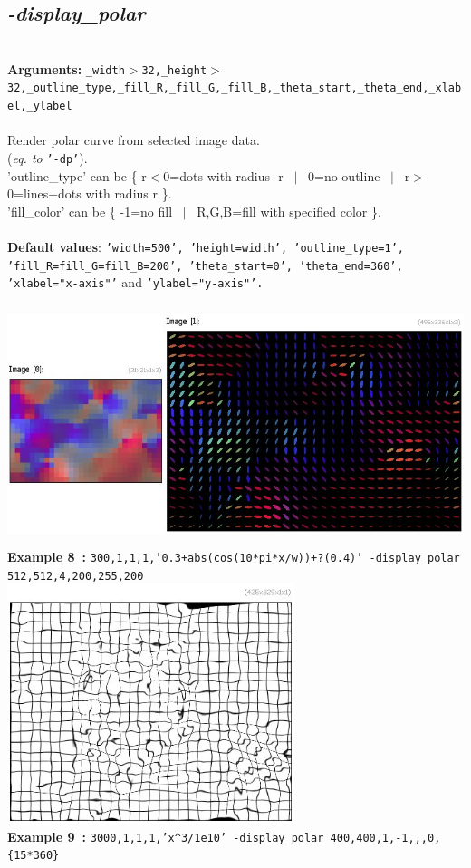\documentclass[a4paper,11pt,twoside]{book}
\begin{document}
\subsection{\emph{-display\_polar} }\vspace*{-0.5em}
~\\\textbf{Arguments: } 
{\small \texttt{\_width$>$32,\_height$>$32,\_outline\_type,\_fill\_R,\_fill\_G,\_fill\_B,\_theta\_start,\_theta\_end,\_xlabel,\_ylabel}}\\~\\
Render polar curve from selected image data.
~\\(\emph{eq. to} {\small \texttt{'-dp'}}).
~\\'outline\_type' can be \{ r$<$0=dots with radius -r ~$|$~ 0=no outline ~$|$~ r$>$0=lines+dots with radius r \}.
~\\'fill\_color' can be \{ -1=no fill ~$|$~ R,G,B=fill with specified color \}.
~\\~\\\textbf{Default values}: {\small \texttt{'width=500', 'height=width', 'outline\_type=1', 'fill\_R=fill\_G=fill\_B=200', 'theta\_start=0', 'theta\_end=360', 'xlabel="x-axis"'} and \texttt{'ylabel="y-axis"'.}}
\begin{center}\includegraphics[keepaspectratio=true,height=7cm,width=\textwidth]{img/gmic_def8.jpg}\\
{\footnotesize \textbf{Example 8~:} \texttt{300,1,1,1,'0.3+abs(cos(10*pi*x/w))+?(0.4)' -display\_polar 512,512,4,200,255,200}}
\\\includegraphics[keepaspectratio=true,height=7cm,width=\textwidth]{img/gmic_def9.jpg}\\
{\footnotesize \textbf{Example 9~:} \texttt{3000,1,1,1,'x\textasciicircum 3/1e10' -display\_polar 400,400,1,-1,,,0,\{15*360\}}}
\end{center}
\end{document}
